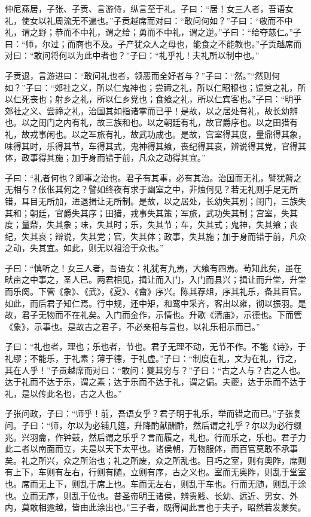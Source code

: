 \documentclass[]{article}
\begin{document}
仲尼燕居，子张、子贡、言游侍，纵言至于礼。子曰：``居！女三人者，吾语女礼，使女以礼周流无不遍也。''子贡越席而对曰：``敢问何如？''子曰：``敬而不中礼，谓之野；恭而不中礼，谓之给；勇而不中礼，谓之逆。''子曰：``给夺慈仁。''子曰：``师，尔过；而商也不及。子产犹众人之母也，能食之不能教也。''子贡越席而对曰：``敢问将何以为此中者也？''子曰：``礼乎礼！夫礼所以制中也。''

子贡退，言游进曰：``敢问礼也者，领恶而全好者与？''子曰：``然。''``然则何如？''子曰：``郊社之义，所以仁鬼神也；尝禘之礼，所以仁昭穆也；馈奠之礼，所以仁死丧也；射乡之礼，所以仁乡党也；食飨之礼，所以仁宾客也。''子曰：``明乎郊社之义、尝禘之礼，治国其如指诸掌而已乎！是故，以之居处有礼，故长幼辨也。以之闺门之内有礼，故三族和也。以之朝廷有礼，故官爵序也。以之田猎有礼，故戎事闲也。以之军旅有礼，故武功成也。是故，宫室得其度，量鼎得其象，味得其时，乐得其节，车得其式，鬼神得其飨，丧纪得其哀，辨说得其党，官得其体，政事得其施；加于身而错于前，凡众之动得其宜。''

子曰：``礼者何也？即事之治也。君子有其事，必有其治。治国而无礼，譬犹瞽之无相与？伥伥其何之？譬如终夜有求于幽室之中，非烛何见？若无礼则手足无所错，耳目无所加，进退揖让无所制。是故，以之居处，长幼失其别；闺门，三族失其和；朝廷，官爵失其序；田猎，戎事失其策；军旅，武功失其制；宫室，失其度；量鼎，失其象；味，失其时；乐，失其节；车，失其式；鬼神，失其飨；丧纪，失其哀；辩说，失其党；官，失其体；政事，失其施；加于身而错于前，凡众之动，失其宜。如此，则无以祖洽于众也。''

子曰：``慎听之！女三人者，吾语女：礼犹有九焉，大飨有四焉。茍知此矣，虽在畎亩之中事之，圣人已。两君相见，揖让而入门，入门而县兴；揖让而升堂，升堂而乐阕。下管《象》、《武》，《夏》、《龠》序兴。陈其荐俎，序其礼乐，备其百官。如此，而后君子知仁焉。行中规，还中矩，和鸾中采齐，客出以雍，彻以振羽。是故，君子无物而不在礼矣。入门而金作，示情也。升歌《清庙》，示德也。下而管《象》，示事也。是故古之君子，不必亲相与言也，以礼乐相示而已。''

子曰：``礼也者，理也；乐也者，节也。君子无理不动，无节不作。不能《诗》，于礼缪；不能乐，于礼素；薄于德，于礼虚。''子曰：``制度在礼，文为在礼，行之，其在人乎！''子贡越席而对曰：``敢问：夔其穷与？''子曰：``古之人与？古之人也。达于礼而不达于乐，谓之素；达于乐而不达于礼，谓之偏。夫夔，达于乐而不达于礼，是以传此名也，古之人也。''

子张问政，子曰：``师乎！前，吾语女乎？君子明于礼乐，举而错之而已。''子张复问。子曰：``师，尔以为必铺几筵，升降酌献酬酢，然后谓之礼乎？尔以为必行缀兆。兴羽龠，作钟鼓，然后谓之乐乎？言而履之，礼也。行而乐之，乐也。君子力此二者以南面而立，夫是以天下太平也。诸侯朝，万物服体，而百官莫敢不承事矣。礼之所兴，众之所治也；礼之所废，众之所乱也。目巧之室，则有奥阼，席则有上下，车则有左右，行则有随，立则有序，古之义也。室而无奥阼，则乱于堂室也。席而无上下，则乱于席上也。车而无左右，则乱于车也。行而无随，则乱于涂也。立而无序，则乱于位也。昔圣帝明王诸侯，辨贵贱、长幼、远近、男女、外内，莫敢相逾越，皆由此涂出也。''三子者，既得闻此言也于夫子，昭然若发蒙矣。
\end{document}
